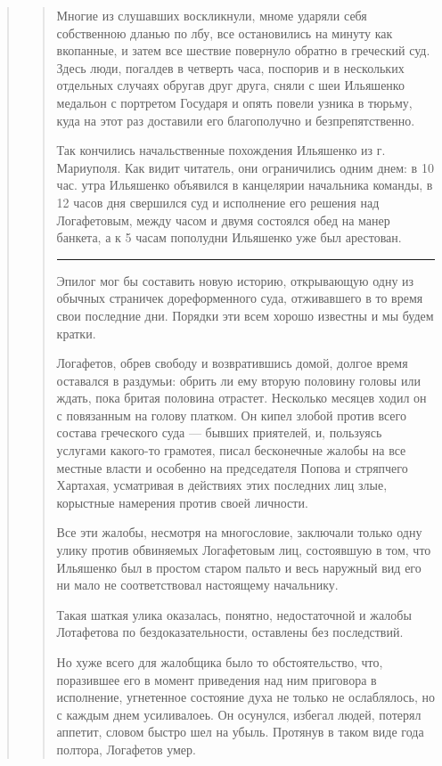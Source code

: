 \begin{quote}
\begin{quote}
Многие из слушавших воскликнули, мноме ударяли себя собственною дланью по лбу, все остановились
на минуту как вкопанные, и затем все шествие повернуло
обратно в греческий суд.  Здесь люди, погалдев в четверть
часа, поспорив и в нескольких отдельных случаях обругав друг друга, сняли с шеи Ильяшенко медальон с портретом
Государя и опять повели узника в тюрьму,
куда на этот раз доставили его благополучно и безпрепятственно.

Так кончились начальственные похождения Ильяшенко из г. Мариуполя. Как видит читатель, они
ограничились одним днем: в 10 час. утра Ильяшенко объявился в канцелярии начальника команды, в 12 часов дня
свершился суд и исполнение его решения над Логафетовым, между часом и двумя состоялся обед на манер банкета, а к 
5 часам пополудни Ильяшенко уже был арестован.

\par\noindent\rule{\textwidth}{0.4pt}

Эпилог мог бы составить новую историю, открывающую одну из обычных страничек дореформенного суда,
отживавшего в то время свои последние дни. Порядки эти всем хорошо известны и мы будем кратки.

Логафетов, обрев свободу и возвратившись домой, долгое время оставался в
раздумьи: обрить ли ему вторую половину головы или ждать, пока бритая половина
отрастет.  Несколько месяцев ходил он с повязанным на голову платком. Он кипел
злобой против всего состава греческого суда — бывших приятелей, и, пользуясь
услугами какого-то грамотея, писал бесконечные жалобы на все местные власти и
особенно на председателя Попова и стряпчего Хартахая, усматривая в действиях
этих последних лиц злые, корыстные намерения против своей личности.

Все эти жалобы, несмотря на многословие, заключали только одну улику против обвиняемых
Логафетовым лиц, состоявшую в том, что Ильяшенко был в простом
старом пальто и весь наружный вид его ни мало не соответствовал настоящему начальнику.

Такая шаткая улика оказалась, понятно, недостаточной
и жалобы Лотафетова по бездоказательности, оставлены без
последствий.

Но хуже всего для жалобщика было то обстоятельство, что, поразившее его в
момент приведения над ним приговора в исполнение, угнетенное состояние духа не
только не ослаблялось, но с каждым днем усиливалоеь. Он осунулся, избегал
людей, потерял аппетит, словом быстро шел на убыль. Протянув в таком виде года
полтора, Логафетов умер.


\end{quote}
\end{quote}
